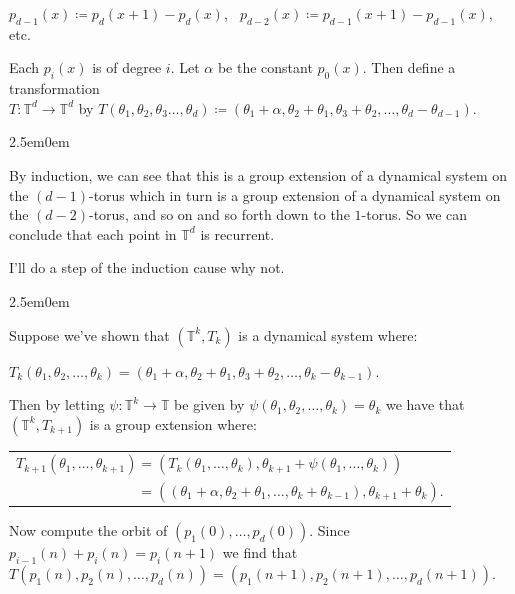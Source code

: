 \documentclass{book}
\newcommand{\pracTwo}{
   \color{Orange}%
   \fontsize{12}{14}\selectfont%
}
\newcommand{\exThreeP}{%
   \color{RedViolet}%
   \fontsize{12}{14}\selectfont%
}
\newcommand{\exPPP}{%
   \color{VioletRed}%
   \fontsize{12}{14}\selectfont%
}
\newenvironment{myIndent}{%
   \begin{adjustwidth}{2.5em}{0em}%
}{%
   \end{adjustwidth}%
}
\newcommand{\retTwo}{\hfill\bigbreak}
\begin{document}
{\centering $p_{d-1}(x) \coloneqq p_d(x + 1) - p_d(x)$, $\phantom{a}p_{d-2}(x) \coloneqq p_{d-1}(x + 1) - p_{d-1}(x)$, etc. \retTwo\par}

Each $p_i(x)$ is of degree $i$. Let $\alpha$ be the constant $p_0(x)$. Then define a transformation\\ $T: \mathbb{T}^d \to \mathbb{T}^d$ by $T(\theta_1, \theta_2, \theta_3 \ldots, \theta_d) \coloneqq (\theta_1 + \alpha, \theta_2 + \theta_1, \theta_3 + \theta_2, \ldots, \theta_d - \theta_{d-1})$.

\begin{myIndent}\pracTwo
	By induction, we can see that this is a group extension of a dynamical system on the $(d-1)$-torus which in turn is a group extension of a dynamical system on the $(d-2)$-torus, and so on and so forth down to the $1$-torus. So we can conclude that each point in $\mathbb{T}^d$ is recurrent.\retTwo

	\exThreeP I'll do a step of the induction cause why not.
	\begin{myIndent}\exPPP
		Suppose we've shown that $(\mathbb{T}^{k}, T_k)$ is a dynamical system where:
		
		{\centering$T_k(\theta_1, \theta_2, \ldots, \theta_k) = (\theta_1 + \alpha, \theta_2 + \theta_1, \theta_3 + \theta_2, \ldots, \theta_k - \theta_{k-1})$.\retTwo\par}

		Then by letting $\psi : \mathbb{T}^k \to \mathbb{T}$ be given by $\psi(\theta_1, \theta_2, \ldots, \theta_k) = \theta_k$ we have that $(\mathbb{T}^k, T_{k+1})$ is a group extension where:

		{\centering\begin{tabular}{l}
			$T_{k+1}(\theta_1, \ldots, \theta_{k+1}) = (T_k(\theta_1, \dots, \theta_{k}), \theta_{k+1} + \psi(\theta_1, \dots, \theta_{k}))$\\ [4pt]
			$\phantom{T_{k+1}(\theta_1, \ldots, \theta_{k+1})} = ((\theta_1 + \alpha, \theta_2 + \theta_1, \ldots, \theta_{k} + \theta_{k-1}), \theta_{k+1} + \theta_k)$.
		\end{tabular} \newpage\par}
	\end{myIndent}
\end{myIndent}

Now compute the orbit of $(p_1(0), \ldots, p_d(0))$. Since $p_{i-1}(n) + p_i(n) = p_i(n + 1)$ we find that $T(p_1(n), p_2(n), \ldots, p_d(n)) = (p_1(n + 1), p_2(n+1), \ldots, p_d(n+1))$.\retTwo
\end{document}
